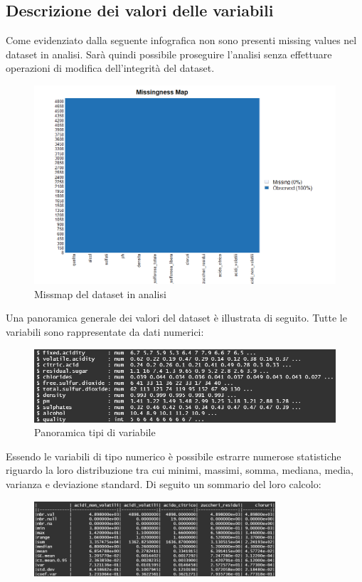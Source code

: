 \documentclass[12pt]{article}
\begin{document}
\subsection{Descrizione dei valori delle variabili}
Come evidenziato dalla seguente infografica non sono presenti missing values nel dataset in analisi. Sarà quindi possibile proseguire l'analisi senza effettuare operazioni di modifica dell'integrità del dataset.
\begin{figure}[!htb]
    \centering
    \includegraphics[width=1\textwidth]{immagini/missmap.png}
    \caption{Missmap del dataset in analisi}
\end{figure}
\FloatBarrier
Una panoramica generale dei valori del dataset è illustrata di seguito. Tutte le variabili sono rappresentate da dati numerici:
\begin{figure}[!htb]
    \centering
    \includegraphics[width=1\textwidth]{immagini/str.png}
    \caption{Panoramica tipi di variabile}
\end{figure}
\FloatBarrier
Essendo le variabili di tipo numerico è possibile estrarre numerose statistiche riguardo la loro distribuzione tra cui minimi, massimi, somma, mediana, media, varianza e deviazione standard. Di seguito un sommario del loro calcolo:
\begin{figure}[!htb]
    \centering
    \includegraphics[width=0.8\textwidth]{immagini/sum.png}
\end{figure}
\end{document}
